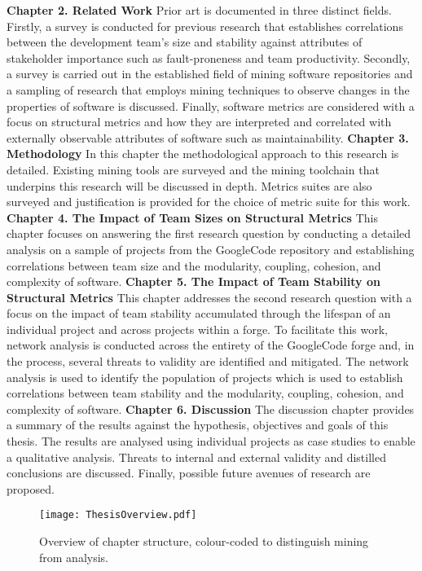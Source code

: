 \textbf{Chapter 2. Related Work} Prior art is documented in three distinct fields. Firstly, a survey is conducted for previous research that establishes correlations between the development team's size and stability against attributes of stakeholder importance such as fault-proneness and team productivity. Secondly, a survey is carried out in the established field of mining software repositories and a sampling of research that employs mining techniques to observe changes in the properties of software is discussed. Finally, software metrics are considered with a focus on structural metrics and how they are interpreted and correlated with externally observable attributes of software such as maintainability.
\newline
\newline
\textbf{Chapter 3. Methodology} In this chapter the methodological approach to this research is detailed. Existing mining tools are surveyed and the mining toolchain that underpins this research will be discussed in depth. Metrics suites are also surveyed and justification is provided for the choice of metric suite for this work. 
\newline
\newline
\textbf{Chapter 4. The Impact of Team Sizes on Structural Metrics} This chapter focuses on answering the first research question by conducting a detailed analysis on a sample of projects from the GoogleCode repository and establishing correlations between team size and the modularity, coupling, cohesion, and complexity of software.
\newline
\newline
\textbf{Chapter 5. The Impact of Team Stability on Structural Metrics} This chapter addresses the second research question with a focus on the impact of team stability accumulated through the lifespan of an individual project and across projects within a forge. To facilitate this work, network analysis is conducted across the entirety of the GoogleCode forge and, in the process, several threats to validity are identified and mitigated. The network analysis is used to identify the population of projects which is used to establish correlations between team stability and the modularity, coupling, cohesion, and complexity of software.
\newline
\newline
\textbf{Chapter 6. Discussion} The discussion chapter provides a summary of the results against the hypothesis, objectives and goals of this thesis. The results are analysed using individual projects as case studies to enable a qualitative analysis. Threats to internal and external validity and distilled conclusions are discussed. Finally, possible future avenues of research are proposed.

\begin{landscape}
\begin{figure}[htbp!] 
\centering    
\texttt{[image: ThesisOverview.pdf]}
\caption[Thesis overview.]{Overview of chapter structure, colour-coded to distinguish mining from analysis.}
\label{fig:ThesisOverview}
\end{figure}
\end{landscape}
 